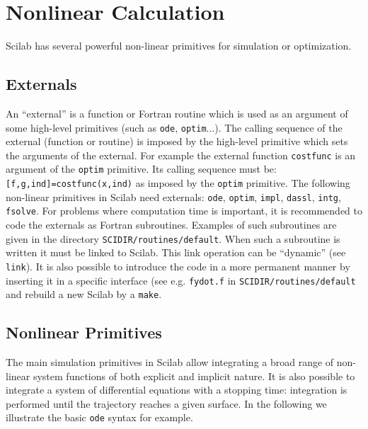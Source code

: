 \section{Nonlinear Calculation}
\label{ch6}

	Scilab has several powerful non-linear primitives for simulation
or optimization.
\subsection{Externals}
An ``external'' is a function or Fortran routine which is used as an argument
of some high-level primitives (such as {\tt ode}, {\tt optim}...).
The calling sequence of the external (function or routine) is imposed by
the high-level primitive which sets the arguments of the external.
For example the external function {\tt costfunc} is an argument of 
the {\tt optim} primitive. Its calling sequence must be: 
{\tt [f,g,ind]=costfunc(x,ind)} as imposed by the {\tt optim} primitive.
The following non-linear primitives in Scilab need externals: 
{\tt ode}, {\tt optim}, {\tt impl}, {\tt dassl}, {\tt intg}, {\tt fsolve}.
For problems where computation time is important, it is recommended
to code the externals as Fortran subroutines. Examples of such
subroutines are given in the directory {\tt SCIDIR/routines/default}.
When such a subroutine is written it must be linked to Scilab.
This link operation can be ``dynamic'' (see {\tt link}). It is
also possible to introduce the code in a more permanent manner by 
inserting it in a specific interface (see e.g.
{\tt fydot.f} in {\tt SCIDIR/routines/default} and rebuild a new Scilab
by a {\tt make}.

\subsection{Nonlinear Primitives}
The main simulation primitives
in Scilab allow integrating a broad range of non-linear system functions of
both explicit and implicit nature. It is also possible to integrate
a system of differential equations with a stopping time: 
integration is performed until the trajectory reaches a given surface.
In the following we illustrate the basic {\tt ode} syntax for example.

